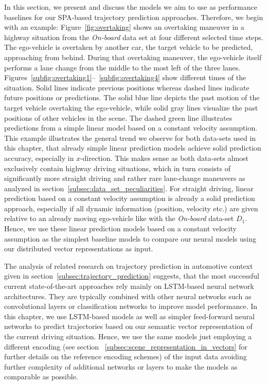 In this section, we present and discuss the models we aim to use as performance baselines for our \ac{SPA}-based trajectory prediction approaches.
Therefore, we begin with an example:
Figure~\ref{fig:overtaking} shows an overtaking maneuver in a highway situation from the \emph{On-board} data set at four different selected time steps.
The ego-vehicle is overtaken by another car, the target vehicle to be predicted, approaching from behind.
During that overtaking maneuver, the ego-vehicle itself performs a lane change from the middle to the most left of the three lanes.
Figures~\ref{subfig:overtaking1}--~\ref{subfig:overtaking4} show different times of the situation.
Solid lines indicate previous positions whereas dashed lines indicate future positions or predictions.
The solid blue line depicts the past motion of the target vehicle overtaking the ego-vehicle, while solid gray lines visualize the past positions of other vehicles in the scene.
The dashed green line illustrates predictions from a simple linear model based on a constant velocity assumption.
This example illustrates the general trend we observe for both data-sets used in this chapter, that already simple linear prediction models achieve solid prediction accuracy, especially in $x$-direction.
This makes sense as both data-sets almost exclusively contain highway driving situations, which in turn consists of significantly more straight driving and rather rare lane-change maneuvers as analyzed in section~\ref{subsec:data_set_peculiarities}.
For straight driving, linear prediction based on a constant velocity assumption is already a solid prediction approach, especially if all dynamic information (position, velocity etc.) are given relative to an already moving ego-vehicle like with the \emph{On-board} data-set $D_1$.
Hence, we use these linear prediction models based on a constant velocity assumption as the simplest baseline models to compare our neural models using our distributed vector representations as input.

The analysis of related research on trajectory prediction in automotive context given in section~\ref{subsec:trajectory_prediction} suggests, that the most successful current state-of-the-art approaches rely mainly on \ac{LSTM}-based neural network architectures.
They are typically combined with other neural networks such as convolutional layers or classification networks \cite{Deo2018a} to improve model performance.
In this chapter, we use \ac{LSTM}-based models as well as simpler feed-forward neural networks to predict trajectories based on our semantic vector representation of the current driving situation.
Hence, we use the same models just employing a different encoding (see section ~\ref{subsec:scene_representation_in_vectors} for further details on the reference encoding schemes) of the input data avoiding further complexity of additional networks or layers to make the models as comparable as possible.

